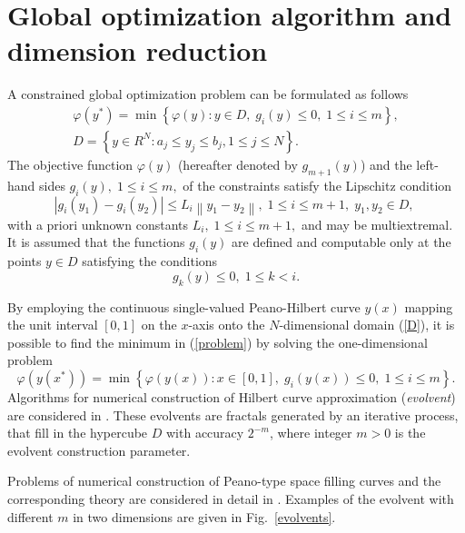 \documentclass{llncs}
\begin{document}
\section{Global optimization algorithm and dimension reduction}

A constrained global optimization problem can be formulated as follows
\begin{gather}\label{problem}
\varphi(y^\ast)=\min{\left\{\varphi(y):y\in D, \; g_i(y)\leq 0, \; 1 \leq i \leq m\right\}},\\
D=\left\{y\in R^N: a_j\leq y_j \leq b_j, 1\leq j \leq N \right\}.\label{D}
\end{gather}
The objective function $\varphi(y)$ (hereafter denoted by $g_{m+1}(y)$) and the left-hand 
sides $g_i(y), \; 1\leq i \leq m,$ of the constraints satisfy the Lipschitz condition 
\[
\left|g_i(y_1)-g_i(y_2)\right|\leq L_i\left\|y_1-y_2\right\|, \;1\leq i\leq m+1, \; y_1,y_2 \in D,\;
\]
with a priori unknown constants $L_i, \; 1 \leq i \leq m+1,$ and may be multiextremal. It is 
assumed that the functions $g_i(y)$ are defined and computable only at the points $y \in D$ 
satisfying the conditions
\begin{equation}\label{g_k}
g_k(y) \leq 0, \; 1 \leq k < i.
\end{equation}

By employing the continuous single-valued Peano-Hilbert curve $y(x)$ mapping the unit 
interval 
$[0,1]$ on the $x$-axis onto the $N$-dimensional domain (\ref{D}), it is possible to find the 
minimum in (\ref{problem}) by solving the one-dimensional problem
\[
\varphi(y(x^\ast))=\min \left\{\varphi(y(x)): x \in [0,1], \; g_i(y(x))\leq 0, \; 1 \leq i \leq m\right\}.
\]
Algorithms for numerical construction of Hilbert curve approximation (\textit{evolvent}) are 
considered in \cite{Strongin2013}. These evolvents are fractals generated by an iterative
process, that fill in the hypercube $D$ with accuracy $2^{-m}$, where integer $m>0$ is the 
evolvent construction parameter. 

Problems of numerical construction of Peano-type space filling curves and the corresponding 
theory are considered in detail in \cite{Strongin2000,Strongin2013}. Examples of the evolvent 
with different $m$ in two dimensions are given in Fig.~\ref{evolvents}.
\end{document}

